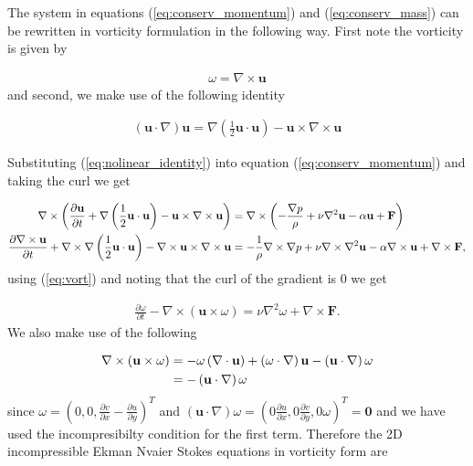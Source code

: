 \documentclass[9pt]{article}
\newcommand{\pder}[2]{\frac{\partial #1}{\partial #2}}               %
\newcommand{\grad}[1]{\nabla{#1}}								%
\newcommand{\curl}[1]{\nabla \times {#1}}								%
\newcommand{\diverg}[1]{\nabla \cdot {#1}}			%
\newcommand{\bfu}{\mathbf{u}}											%
\begin{document}
The system in equations (\ref{eq:conserv_momentum}) and (\ref{eq:conserv_mass}) can be rewritten in vorticity formulation in the following way. First note the vorticity is given by 

\begin{align}
	\omega = \curl{\bfu}
	\label{eq:vort}
\end{align}
and second, we make use of the following identity

\begin{align}
	\left(\bfu \cdot \nabla \right)\bfu = \nabla \left( \frac{1}{2} \bfu \cdot \bfu \right) - \bfu \times \curl{\bfu}
	\label{eq:nolinear_identity}
\end{align}

Substituting (\ref{eq:nolinear_identity}) into equation (\ref{eq:conserv_momentum}) and taking the curl we get

\begin{align}
	\curl{\left(\pder{\bfu}{t} + \nabla \left( \frac{1}{2} \bfu \cdot \bfu \right) - \bfu \times \curl{\bfu}\right)} &= \curl{\left( -\frac{\nabla p}{\rho} + \nu \nabla^2  \bfu  - \alpha \bfu + \mathbf{F} \right)} \notag \\
	\pder{\curl{\bfu}}{t} + \curl{\nabla \left( \frac{1}{2} \bfu \cdot \bfu \right)} - \curl{\bfu \times \curl{\bfu}} &= -\frac{1}{\rho}\curl{\grad{p}} + \nu \curl{\nabla^2 \bfu } -\alpha \curl{\bfu} + \curl{\mathbf{F}} \notag,
\end{align}
using (\ref{eq:vort}) and noting that the curl of the gradient is 0 we get 

\begin{align}
	\pder{\omega}{t} - \curl{\left( \bfu  \times \omega\right)} = \nu \nabla^2 \omega + \curl{\mathbf{F}}.
\end{align}
We also make use of the following

\begin{align}
	\curl{\left( \bfu  \times \omega\right)} &= -\omega \left(\diverg{\bfu} \right) + \left( \omega \cdot \nabla\right)\bfu - \left(\bfu \cdot \nabla\right)\omega \notag \\
	&= - \left(\bfu \cdot \nabla\right)\omega
\end{align}
since $\omega = \left(0, 0, \pder{v}{x} - \pder{u}{y}\right)^{T}$ and $ \left(\bfu \cdot \nabla\right)\omega = \left(0 \pder{u}{x}, 0 \pder{v}{y}, 0 \omega\right)^T = \mathbf{0}$ and we have used the incompresibilty condition for the first term. 
Therefore the 2D incompressible Ekman Nvaier Stokes equations in vorticity form are 
\end{document}

